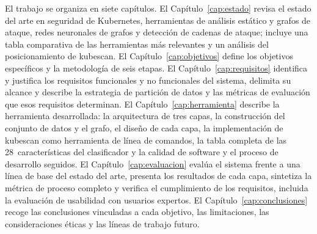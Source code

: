 El trabajo se organiza en siete capítulos. El Capítulo~\ref{cap:estado} revisa el
estado del arte en seguridad de Kubernetes, herramientas de análisis
estático y grafos de ataque, redes neuronales de grafos y detección de cadenas
de ataque; incluye una tabla comparativa de las herramientas más relevantes y un
análisis del posicionamiento de kubescan. El
Capítulo~\ref{cap:objetivos} define los objetivos específicos y la metodología
de seis etapas. El Capítulo~\ref{cap:requisitos} identifica y justifica los
requisitos funcionales y no funcionales del sistema, delimita su alcance y
describe la estrategia de partición de datos y las métricas de evaluación que
esos requisitos determinan. El Capítulo~\ref{cap:herramienta} describe la
herramienta desarrollada: la arquitectura de tres capas, la construcción del
conjunto de datos y el grafo, el diseño de cada capa, la implementación de kubescan
como herramienta de línea de comandos, la tabla completa de las
28~características del clasificador y la calidad de software y el proceso de
desarrollo seguidos. El Capítulo~\ref{cap:evaluacion} evalúa el
sistema frente a una línea de base del estado del arte, presenta los resultados
de cada capa, sintetiza la métrica de proceso completo y verifica el
cumplimiento de los requisitos, incluida la evaluación de usabilidad con
usuarios expertos. El Capítulo~\ref{cap:conclusiones} recoge las conclusiones
vinculadas a cada objetivo, las limitaciones, las consideraciones éticas y las
líneas de trabajo futuro.
